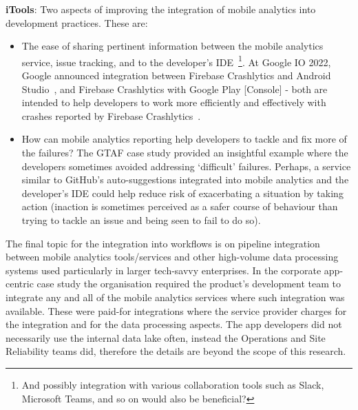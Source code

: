 \textbf{iTools}: 
Two aspects of improving the integration of mobile analytics into development practices. These are:
\begin{itemize}
    \itemsep0em
    \item The ease of sharing pertinent information between the mobile analytics service, issue tracking, and to the developer's IDE~\footnote{And possibly integration with various collaboration tools such as Slack, Microsoft Teams, and so on would also be beneficial?}. At Google IO 2022, Google announced integration between Firebase Crashlytics and Android Studio~\citep{android2022_firebase_crash_integration_into_android_studio_electric_eel}, and Firebase Crashlytics with Google Play [Console] - both are intended to help developers to work more efficiently and effectively with crashes reported by Firebase Crashlytics~\citep{firebaseblog2022_whats_new_at_google_io}. 
    \item How can mobile analytics reporting help developers to tackle and fix more of the failures? The GTAF case study provided an insightful example where the developers sometimes avoided addressing `difficult' failures. Perhaps, a service similar to GitHub's auto-suggestions integrated into mobile analytics and the developer's IDE could help reduce risk of exacerbating a situation by taking action (inaction is sometimes perceived as a safer course of behaviour than trying to tackle an issue and being seen to fail to do so).  
\end{itemize}

The final topic for the integration into workflows is on pipeline integration between mobile analytics tools/services and other high-volume data processing systems used particularly in larger tech-savvy enterprises. In the corporate app-centric case study the organisation required the product's development team to integrate any and all of the mobile analytics services where such integration was available. These were paid-for integrations where the service provider charges for the integration and for the data processing aspects. The app developers did not necessarily use the internal data lake often, instead the Operations and Site Reliability teams did, therefore the details are beyond the scope of this research.


